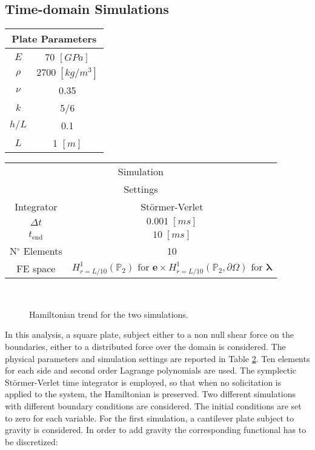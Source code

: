 \documentclass[11pt]{article}
\begin{document}
\subsection{Time-domain Simulations}
	\begin{table}[h!]
		\centering
		\begin{tabular}{|c|c|}
			\hline 
			\multicolumn{2}{|c|}{Plate Parameters} \\ 
			\hline 
			$E$ & 70 $[GPa]$ \\ 
			$\rho$ & $2700\; [kg/m^3]$ \\ 
			$\nu$& 0.35 \\ 
			$k$& 5/6 \\ 
			$h/L$& 0.1 \\ 
			$L$& 1 $[m]$ \\
			\hline 
		\end{tabular} 
		\begin{tabular}{|c|c|}
			\hline 
			\multicolumn{2}{|c|}{Simulation} \\  
			\multicolumn{2}{|c|}{Settings} \\  
			\hline 
			Integrator & St\"ormer-Verlet \\ 
			$\Delta t$ & $0.001\; [ms]$ \\ 
			$t_{\text{end}}$ & $10\; [ms]$ \\ 
			N$^\circ$ Elements & 10 \\
			FE space & $H_{r = L/10}^1(\mathbb{P}_2)\text{ for }\bm{e} \times H_{r = L/10}^1(\mathbb{P}_2, \partial\Omega)\text{ for }\bm{\lambda}$ \\
			\hline 
		\end{tabular} 
		\captionsetup{width=0.95\linewidth}
		\vspace{1mm}
		\label{tab:par}
	\end{table}
	\begin{figure}[t]%
		\centering
		\hspace{8pt}%
		 \\
		\caption[Hamiltonian]{Hamiltonian trend for the two simulations.}
		\label{fig:Hamiltonian}
	\end{figure}
	In this analysis, a square plate, subject either to a non null shear force on the boundaries, either to a distributed force over the domain is considered. The physical parameters and simulation settings are reported in Table \ref{tab:par}. Ten elements for each side and second order Lagrange polynomials are used. The symplectic St\"ormer-Verlet time integrator is employed, so that when no solicitation is applied to the system, the Hamiltonian is preserved. Two different simulations with different boundary conditions are considered. The initial conditions are set to zero for each variable. For the first simulation, a cantilever plate subject to gravity is considered. In order to add gravity the corresponding functional has to be discretized:
\end{document}
